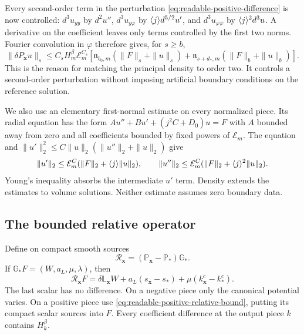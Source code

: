 Every second-order term in the perturbation
\eqref{eq:readable-positive-difference} is now controlled:
$d^3u_{yy}$ by $d^2u''$, $d^3u_{y\varphi}$ by
$\langle j\rangle d^{5/2}u'$, and $d^3u_{\varphi\varphi}$ by
$\langle j\rangle^2d^3u$. A derivative on the coefficient leaves only terms
controlled by the first two norms. Fourier convolution in $\varphi$
therefore gives, for $s\ge b$,
\begin{equation}\label{eq:readable-positive-relative-bound}
 \|\delta P_{\mathbf x}u\|_s
 \le C_sH_m^\beta\mathcal E_m^{C_s}
 \left[\mathfrak n_{b_0,m}(\|F\|_s+\|u\|_s)
       +\mathfrak n_{s+d_*,m}(\|F\|_b+\|u\|_b)\right].
\end{equation}
This is the reason for matching the principal density to order two.
It controls a second-order perturbation without imposing artificial
boundary conditions on the reference solution.

We also use an elementary first-normal estimate on every normalized
piece. Its radial equation has the form
$Au''+Bu'+(j^2C+D_0)u=F$ with $A$ bounded away from zero and all
coefficients bounded by fixed powers of $\mathcal E_m$.
The equation and
$\|u'\|_2^2\le C\|u\|_2(\|u''\|_2+\|u\|_2)$ give
\begin{equation}\label{eq:vol-reference-first-normal-bound}
 \|u'\|_2\le\mathcal E_m^C(\|F\|_2+\langle j\rangle\|u\|_2),
 \qquad
 \|u''\|_2\le\mathcal E_m^C(\|F\|_2+\langle j\rangle^2\|u\|_2).
\end{equation}
Young's inequality absorbs the intermediate $u'$ term. Density
extends the estimates to volume solutions. Neither estimate assumes
zero boundary data.

\subsection{The bounded relative operator}

Define on compact smooth sources
\[
 \mathscr R_{\mathbf x}=(\mathbb P_{\mathbf x}-\mathbb P_*)\mathbb G_*.
\]
If $\mathbb G_*F=(W,a_L,\mu,\lambda)$, then
\begin{equation}\label{eq:vol-normalized-relative-identity}
 \mathscr R_{\mathbf x}F
 =\delta\mathbb L_{\mathbf x}W
      +a_L(s_{\mathbf x}-s_*)+\mu(k_{\mathbf x}^c-k_*^c).
\end{equation}
The last scalar has no difference. On a negative piece only the
canonical potential varies. On a positive piece use
\eqref{eq:readable-positive-relative-bound}, putting its compact scalar
sources into $F$. Every coefficient difference at the output piece
$k$ contains $H_k^\beta$.

